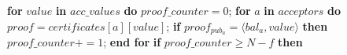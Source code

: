 \begin{algorithm}
\begin{algorithmic}[1]
		\State \hspace{\algorithmicindent}\hspace{\algorithmicindent}\hspace{\algorithmicindent} 
		\textbf{for} $value$ \textbf{in} $acc\_values$ \textbf{do}
		\State 
		\hspace{\algorithmicindent}\hspace{\algorithmicindent}\hspace{\algorithmicindent}\hspace{\algorithmicindent} $proof\_counter = 0$;
		\State \hspace{\algorithmicindent}\hspace{\algorithmicindent}\hspace{\algorithmicindent}\hspace{\algorithmicindent} \textbf{for} $a$ \textbf{in} $acceptors$ \textbf{do}
		\State 
		\hspace{\algorithmicindent}\hspace{\algorithmicindent}\hspace{\algorithmicindent}\hspace{\algorithmicindent}\hspace{\algorithmicindent} 
		$proof = certificates[a][value]$;
		\State \hspace{\algorithmicindent}\hspace{\algorithmicindent}\hspace{\algorithmicindent}\hspace{\algorithmicindent}\hspace{\algorithmicindent} \textbf{if} $proof_{pub_a} = \langle bal_a, value \rangle$ \textbf{then}
		\State \hspace{\algorithmicindent}\hspace{\algorithmicindent}\hspace{\algorithmicindent}\hspace{\algorithmicindent}\hspace{\algorithmicindent}\hspace{\algorithmicindent} $proof\_counter \mathrel{+{=}} 1$;
		\State \hspace{\algorithmicindent}\hspace{\algorithmicindent}\hspace{\algorithmicindent}\hspace{\algorithmicindent} \textbf{end for}
		\State
		\State \hspace{\algorithmicindent}\hspace{\algorithmicindent}\hspace{\algorithmicindent}\hspace{\algorithmicindent} \textbf{if} $proof\_counter \geq N-f$ \textbf{then}

\end{algorithmic}
\end{algorithm}
